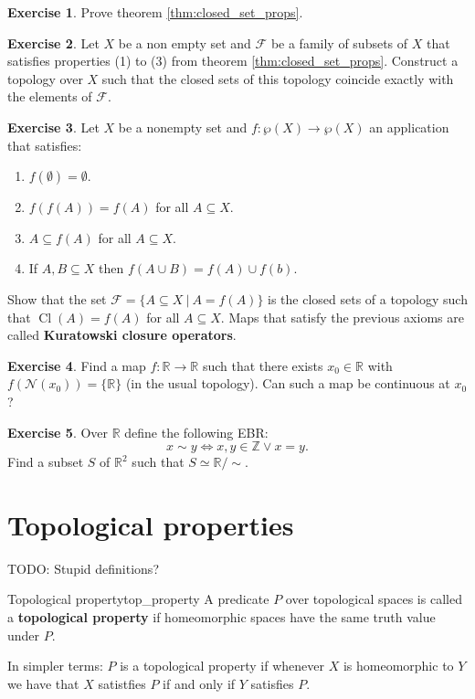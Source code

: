 \documentclass[a4paper]{book}
\theoremstyle{definition}
\theoremstyle{ejemplo}
\newtheorem{exercise}{Exercise}[chapter]
\theoremstyle{demostracion}
\newcommand{\reales}{\mathbb{R}}
\newcommand{\enteros}{\mathbb{Z}}
\DeclareMathOperator{\closure}{Cl}
\begin{document}
\begin{exercise}\label{exer:closed_set_props}
	Prove theorem \eqref{thm:closed_set_props}.
\end{exercise}

\begin{exercise}\label{exer:topology_from_closed}
	Let $X$ be a non empty set and $\mathcal{F}$ be a family of subsets of $X$ that satisfies properties (1) to (3) from theorem \eqref{thm:closed_set_props}. Construct a topology over $X$ such that the closed sets of this topology coincide exactly with the elements of $\mathcal{F}$.
\end{exercise}

\begin{exercise}
	Let $X$ be a nonempty set and $f: \wp(X) \rightarrow \wp(X)$ an application that satisfies:
	\begin{enumerate}
		\item
		$f(\emptyset) = \emptyset$.
		\item
		$f(f(A)) = f(A)$ for all $A \subseteq X$.
		\item
		$A \subseteq f(A)$ for all $A \subseteq X$.
		\item
		If $A, B \subseteq X$ then $f(A \cup B) = f(A) \cup f(b)$.
	\end{enumerate}
	Show that the set $\mathcal{F} = \{A \subseteq X\ |\ A = f(A) \}$ is the closed sets of a topology such that $\closure(A) = f(A)$ for all $A \subseteq X$. Maps that satisfy the previous axioms are called \textbf{Kuratowski closure operators}.
\end{exercise}

\begin{exercise}
	Find a map $f: \reales \rightarrow \reales$ such that there exists $x_0 \in \reales$ with $f(\mathcal{N}(x_0)) = \{ \reales \}$ (in the usual topology). Can such a map be continuous at $x_0$?
\end{exercise}

\begin{exercise}
	Over $\reales$ define the following EBR:
	\begin{equation*}
		x \sim y \Leftrightarrow x,y \in \enteros \vee x = y.
	\end{equation*}
	Find a subset $S$ of $\reales^2$ such that $S \simeq \reales/\sim$.
\end{exercise}





\chapter{Topological properties}
TODO: Stupid definitions?
\begin{define}{Topological property}{top_property}
	A predicate $P$ over topological spaces is called a \textbf{topological property} if homeomorphic spaces have the same truth value under $P$.
\end{define}
In simpler terms: $P$ is a topological property if whenever $X$ is homeomorphic to $Y$ we have that $X$ satistfies $P$ if and only if $Y$ satisfies $P$.
\end{document}

